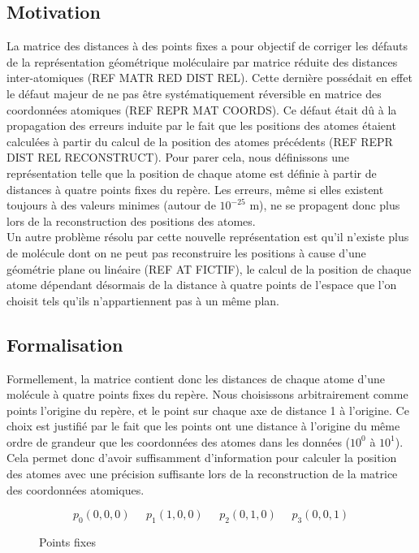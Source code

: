 
\subsection{Motivation}
\par La matrice des distances à des points fixes a pour objectif de corriger les défauts de la représentation géométrique moléculaire par matrice réduite des distances inter-atomiques (REF MATR RED DIST REL). Cette dernière possédait en effet le défaut majeur de ne pas être systématiquement réversible en matrice des coordonnées atomiques (REF REPR MAT COORDS). Ce défaut était dû à la propagation des erreurs induite par le fait que les positions des atomes étaient calculées à partir du calcul de la position des atomes précédents (REF REPR DIST REL RECONSTRUCT). Pour parer cela, nous définissons une représentation telle que la position de chaque atome est définie à partir de distances à quatre points fixes du repère. Les erreurs, même si elles existent toujours à des valeurs minimes (autour de $10^{-25}$ m), ne se propagent donc plus lors de la reconstruction des positions des atomes.\\
Un autre problème résolu par cette nouvelle représentation est qu'il n'existe plus de molécule dont on ne peut pas reconstruire les positions à cause d'une géométrie plane ou linéaire (REF AT FICTIF), le calcul de la position de chaque atome dépendant désormais de la distance à quatre points de l'espace que l'on choisit tels qu'ils n'appartiennent pas à un même plan.\\

\subsection{Formalisation}
\par Formellement, la matrice contient donc les distances de chaque atome d'une molécule à quatre points fixes du repère. Nous choisissons arbitrairement comme points l'origine du repère, et le point sur chaque axe de distance 1 à l'origine. Ce choix est justifié par le fait que les points ont une distance à l'origine du même ordre de grandeur que les coordonnées des atomes dans les données ($10^0$ à $10^1$). Cela permet donc d'avoir suffisamment d'information pour calculer la position des atomes avec une précision suffisante lors de la reconstruction de la matrice des coordonnées atomiques.

\begin{figure}[!h]
	
	\[
		p_0(0, 0, 0) \; \; \; \; \; 
		p_1(1, 0, 0) \; \; \; \; \; 
		p_2(0, 1, 0) \: \; \; \; \; 
		p_3(0, 0, 1)
	\]

	\caption{Points fixes}
\end{figure}

